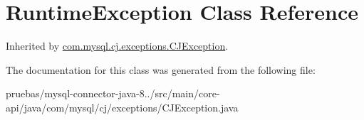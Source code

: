 \hypertarget{class_runtime_exception}{}\section{Runtime\+Exception Class Reference}
\label{class_runtime_exception}


Inherited by \mbox{\hyperlink{classcom_1_1mysql_1_1cj_1_1exceptions_1_1_c_j_exception}{com.\+mysql.\+cj.\+exceptions.\+C\+J\+Exception}}.



The documentation for this class was generated from the following file\+:\begin{DoxyCompactItemize}
\item 
pruebas/mysql-\/connector-\/java-\/8../src/main/core-\/api/java/com/mysql/cj/exceptions/C\+J\+Exception.\+java\end{DoxyCompactItemize}
